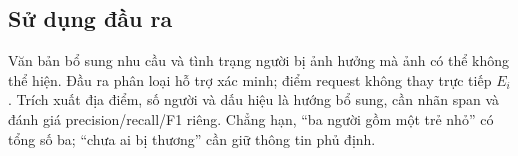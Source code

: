 \subsection{Sử dụng đầu ra}
Văn bản bổ sung nhu cầu và tình trạng người bị ảnh hưởng mà ảnh có thể không thể hiện. Đầu ra phân loại hỗ trợ xác minh; điểm request không thay trực tiếp \(E_i\). Trích xuất địa điểm, số người và dấu hiệu là hướng bổ sung, cần nhãn span và đánh giá precision/recall/F1 riêng. Chẳng hạn, “ba người gồm một trẻ nhỏ” có tổng số ba; “chưa ai bị thương” cần giữ thông tin phủ định.
